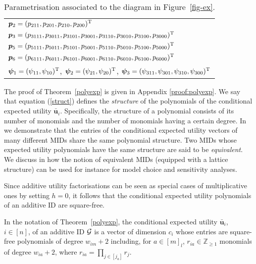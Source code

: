  \begin{table}
\renewcommand{\arraystretch}{1.5}
\begin{center}
\begin{tabular}{|l|}
\hline
$\bm{p}_2=(p_{211},p_{201},p_{210},p_{200})^{\textnormal{T}}$\\
$\bm{p}_3=(p_{3111},p_{3011},p_{3101},p_{3001},p_{3110},p_{3010},p_{3100},p_{3000})^{\textnormal{T}}$\\
$\bm{p}_5=(p_{5111},p_{5011},p_{5101},p_{5001},p_{5110},p_{5010},p_{5100},p_{5000})^{\textnormal{T}}$\\
$\bm{p}_6=(p_{6111},p_{6011},p_{6101},p_{6001},p_{6110},p_{6010},p_{6100},p_{6000})^{\textnormal{T}}$\\
$\bm{\psi}_1=(\psi_{11},\psi_{10})^{\textnormal{T}}$, $\bm{\psi}_2=(\psi_{21},\psi_{20})^{\textnormal{T}}$, $\bm{\psi}_3=(\psi_{311},\psi_{301}, \psi_{310},\psi_{300})^{\textnormal{T}}$\\
\hline
\end{tabular}
\end{center}
\caption{Parametrisation associated to the diagram in Figure~\ref{fig-ex}. \label{para}}
\end{table}

The proof of Theorem~\ref{polyexp} is given in Appendix \ref{proof:polyexp}.  We say that equation (\ref{struct}) defines the \textit{structure} of the polynomials of the conditional expected utility $\bar{\bm{u}}_i$. Specifically, the structure of a polynomial consists of its number of monomials and the number of monomials having a certain degree. In \citet{Leonelli2015a} we demonstrate that the entries of the conditional expected utility vectors of many different MIDs share the same polynomial structure. Two MIDs whose expected utility polynomials have the same structure are said to be \textit{equivalent}. We discuss in \citet{Leonelli2015a} how the notion of equivalent MIDs (equipped with a lattice structure) can be used for instance for model choice and sensitivity analyses.

Since additive utility factorisations can be seen as special cases of multiplicative ones by setting $h=0$, it follows that the conditional expected utility polynomials of an additive ID are square-free.

\begin{corollary} \label{corAID}
In the notation of Theorem~\ref{polyexp}, the conditional expected utility $\bar{\bm{u}}_i$, $i\in [n]$, of an  additive ID $\mathcal{G}$ is a vector of dimension $c_i$ whose entries are square-free polynomials of degree $w_{im}+2$ including, for $a\in[m]_l$, $r_{ia}\in\mathbb{Z}_{\geq 1}$ monomials of degree $w_{ia}+2$, where
$r_{ia}=\prod_{j\in[j_a]}r_j$.
\end{corollary}


